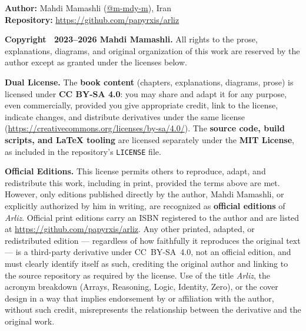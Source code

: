 \begin{flushleft}
	{\small \linespread{0.9}\selectfont

	\textbf{Author:} Mahdi Mamashli (\href{https://github.com/m-mdy-m}{@m-mdy-m}), Iran\\
	\textbf{Repository:} \url{https://github.com/papyrxis/arliz}

	\vspace{0.8em}

	\textbf{Copyright \textcopyright\ 2023--2026 Mahdi Mamashli.} All rights to the prose,
	explanations, diagrams, and original organization of this work are reserved by the author
	except as granted under the licenses below.

	\vspace{0.8em}

	\textbf{Dual License.} The \textbf{book content} (chapters, explanations, diagrams, prose)
	is licensed under \textbf{CC BY-SA 4.0}: you may share and adapt it for any purpose, even
	commercially, provided you give appropriate credit, link to the license, indicate changes,
	and distribute derivatives under the same license
	(\url{https://creativecommons.org/licenses/by-sa/4.0/}). The \textbf{source code, build
	scripts, and LaTeX tooling} are licensed separately under the \textbf{MIT License}, as
	included in the repository's \texttt{LICENSE} file.

	\vspace{0.8em}

	\textbf{Official Editions.} This license permits others to reproduce, adapt, and
	redistribute this work, including in print, provided the terms above are met. However,
	only editions published directly by the author, Mahdi Mamashli, or explicitly authorized
	by him in writing, are recognized as \textbf{official editions} of \textit{Arliz}. Official
	print editions carry an ISBN registered to the author and are listed at
	\url{https://github.com/papyrxis/arliz}. Any other printed, adapted, or redistributed
	edition --- regardless of how faithfully it reproduces the original text --- is a
	third-party derivative under CC~BY-SA~4.0, not an official edition, and must clearly
	identify itself as such, crediting the original author and linking to the source repository
	as required by the license. Use of the title \textit{Arliz}, the acronym breakdown
	(Arrays, Reasoning, Logic, Identity, Zero), or the cover design in a way that implies
	endorsement by or affiliation with the author, without such credit, misrepresents the
	relationship between the derivative and the original work.

}
\end{flushleft}
